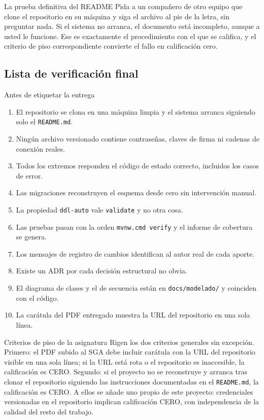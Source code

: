 \documentclass[11pt,a4paper,openany]{book}
\begin{document}
\begin{cajaadvertencia}{La prueba definitiva del README}
	Pida a un compañero de otro equipo que clone el repositorio en su máquina y siga el archivo al pie de la letra, sin preguntar nada. Si el sistema no arranca, el documento está incompleto, aunque a usted le funcione. Ese es exactamente el procedimiento con el que se califica, y el criterio de piso correspondiente convierte el fallo en calificación cero.
\end{cajaadvertencia}

\subsection{Lista de verificación final}
\label{sec:lista-final}

\begin{cajabuenas}{Antes de etiquetar la entrega}
	\begin{enumerate}
		\item El repositorio se clona en una máquina limpia y el sistema arranca siguiendo solo el \texttt{README.md}.
		\item Ningún archivo versionado contiene contraseñas, claves de firma ni cadenas de conexión reales.
		\item Todos los extremos responden el código de estado correcto, incluidos los casos de error.
		\item Las migraciones reconstruyen el esquema desde cero sin intervención manual.
		\item La propiedad \texttt{ddl-auto} vale \texttt{validate} y no otra cosa.
		\item Las pruebas pasan con la orden \texttt{mvnw.cmd verify} y el informe de cobertura se genera.
		\item Los mensajes de registro de cambios identifican al autor real de cada aporte.
		\item Existe un ADR por cada decisión estructural no obvia.
		\item El diagrama de clases y el de secuencia están en \texttt{docs/modelado/} y coinciden con el código.
		\item La carátula del PDF entregado muestra la URL del repositorio en una sola línea.
	\end{enumerate}
\end{cajabuenas}

\begin{cajaadvertencia}{Criterios de piso de la asignatura}
	Rigen los dos criterios generales sin excepción. Primero: el PDF subido al SGA debe incluir carátula con la URL del repositorio visible en una sola línea; si la URL está rota o el repositorio es inaccesible, la calificación es CERO. Segundo: si el proyecto no se reconstruye y arranca tras clonar el repositorio siguiendo las instrucciones documentadas en el \texttt{README.md}, la calificación es CERO. A ellos se añade uno propio de este proyecto: credenciales versionadas en el repositorio implican calificación CERO, con independencia de la calidad del resto del trabajo.
\end{cajaadvertencia}
\end{document}
